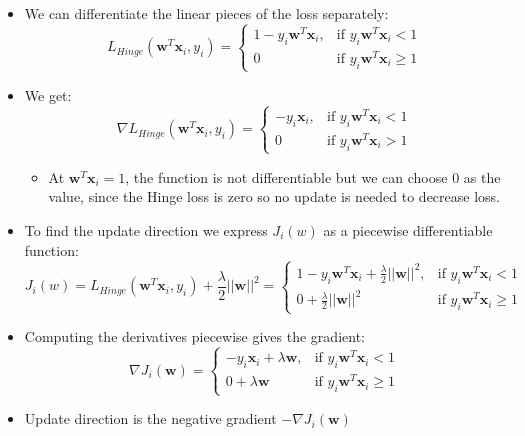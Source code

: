 \documentclass[12pt, a4paper]{article}
\begin{document}
\begin{itemize}
  \item We can differentiate the linear pieces of the loss separately:
  $$
  L_{Hinge}(\mathbf{w}^T \mathbf{x}_i, y_i) =
  \begin{cases}
  1 - y_i \mathbf{w}^T \mathbf{x}_i,     & \text{if } y_i \mathbf{w}^T \mathbf{x}_i < 1 \\
  0  & \text{if } y_i \mathbf{w}^T \mathbf{x}_i \geq 1
  \end{cases}
  $$
  \item We get:
  $$
  \nabla L_{Hinge}(\mathbf{w}^T \mathbf{x}_i, y_i) =
  \begin{cases}
  - y_i \mathbf{x}_i,     & \text{if } y_i \mathbf{w}^T \mathbf{x}_i < 1 \\
  0  & \text{if } y_i \mathbf{w}^T \mathbf{x}_i > 1
  \end{cases}
  $$
  \begin{itemize}
    \item At $\mathbf{w}^T \mathbf{x}_i = 1$, the function is not differentiable but we can choose 0 as the value, since the Hinge loss is zero so no update is needed to decrease loss.
  \end{itemize}
  \item To find the update direction we express $J_i(w)$ as a piecewise differentiable function:
  $$
  J_i(w) = L_{Hinge}(\mathbf{w}^T \mathbf{x}_i, y_i) + \frac{\lambda}{2}||\mathbf{w}||^2 =
  \begin{cases}
  1 - y_i \mathbf{w}^T \mathbf{x}_i + \frac{\lambda}{2}||\mathbf{w}||^2,     & \text{if } y_i \mathbf{w}^T \mathbf{x}_i < 1 \\
  0 + \frac{\lambda}{2}||\mathbf{w}||^2 & \text{if } y_i \mathbf{w}^T \mathbf{x}_i \geq 1
  \end{cases}
  $$
  \item Computing the derivatives piecewise gives the gradient:
  $$
  \nabla J_i (\mathbf{w}) =
  \begin{cases}
  - y_i \mathbf{x}_i + \lambda \mathbf{w},     & \text{if } y_i \mathbf{w}^T \mathbf{x}_i < 1 \\
  0 + \lambda \mathbf{w} & \text{if } y_i \mathbf{w}^T \mathbf{x}_i \geq 1
  \end{cases}
  $$
  \item Update direction is the negative gradient $- \nabla J_i (\mathbf{w})$
\end{itemize}
\end{document}
